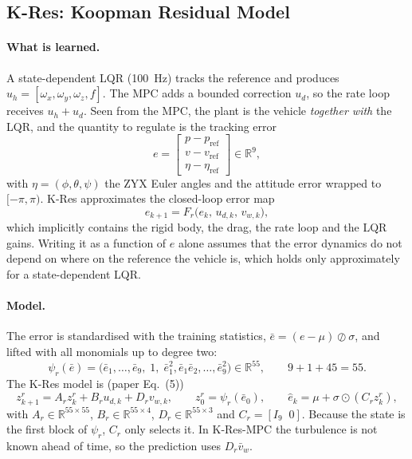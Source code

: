 \documentclass[11pt,a4paper]{article}
\newcommand{\KRes}{\textsf{K-Res}}            %
\newcommand{\KResMPC}{\textsf{K-Res-MPC}}     %
\begin{document}
	\subsection{\KRes: Koopman Residual Model}
	\label{sec:kres}

	\paragraph{What is learned.}
	A state-dependent LQR (100~Hz) tracks the reference and produces $u_h= [\omega_x, \omega_y, \omega_z, f]$. The MPC adds a
	bounded correction $u_d$, so the rate loop receives $u_h + u_d$. Seen from the MPC, the plant
	is the vehicle \emph{together with} the LQR, and the quantity to regulate is the tracking error
	\begin{equation}
		e = \begin{bmatrix} p - p_{\text{ref}} \\ v - v_{\text{ref}} \\ \eta - \eta_{\text{ref}} \end{bmatrix} \in \mathbb{R}^9,
	\end{equation}
	with $\eta = (\phi, \theta, \psi)$ the ZYX Euler angles and the attitude error wrapped to
	$[-\pi, \pi)$. \KRes{} approximates the closed-loop error map
	\begin{equation}
		e_{k+1} = F_r\bigl(e_k,\, u_{d,k},\, v_{w,k}\bigr),
		\label{eqn:kres-true}
	\end{equation}
	which implicitly contains the rigid body, the drag, the rate loop and the LQR gains. Writing it
	as a function of $e$ alone assumes that the error dynamics do not depend on where on the
	reference the vehicle is, which holds only approximately for a state-dependent LQR.

	\paragraph{Model.}
	The error is standardised with the training statistics, $\bar{e} = (e - \mu)\oslash\sigma$, and lifted with all monomials up to degree two:
	\begin{equation}
		\psi_r(\bar{e}) = \bigl(\bar{e}_1, \dots, \bar{e}_9,\; 1,\; \bar{e}_1^2, \bar{e}_1\bar{e}_2, \dots, \bar{e}_9^2\bigr) \in \mathbb{R}^{55},
		\qquad 9 + 1 + 45 = 55.
	\end{equation}
	The \KRes{} model is (paper Eq.~(5))
	\begin{equation}
		\boxed{\;
			z^r_{k+1} = A_r z^r_k + B_r u_{d,k} + D_r v_{w,k}, \qquad
			z^r_0 = \psi_r(\bar{e}_0), \qquad
			\hat{e}_k = \mu + \sigma \odot (C_r z^r_k),
			\;}
		\label{eqn:kres}
	\end{equation}
	with $A_r \in \mathbb{R}^{55\times55}$, $B_r \in \mathbb{R}^{55\times4}$,
	$D_r \in \mathbb{R}^{55\times3}$ and $C_r = [I_9\;\; 0]$. Because the state is the first block of
	$\psi_r$, $C_r$ only selects it. In \KResMPC{} the turbulence is not known ahead of time, so
	the prediction uses $D_r \bar{v}_w$.
\end{document}
